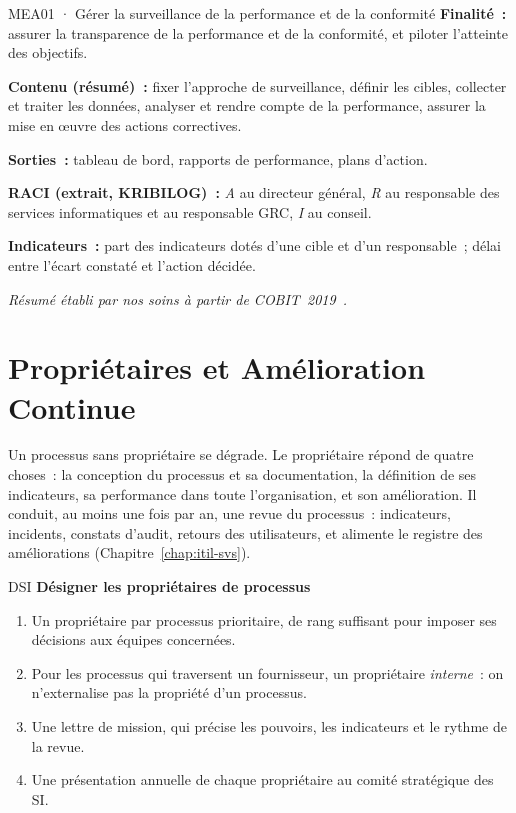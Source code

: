 \begin{boxobjet}{MEA01 · Gérer la surveillance de la performance et de la conformité}
\textbf{Finalité~:} assurer la transparence de la performance et de la
conformité, et piloter l'atteinte des objectifs.

\textbf{Contenu (résumé)~:} fixer l'approche de surveillance, définir les
cibles, collecter et traiter les données, analyser et rendre compte de la
performance, assurer la mise en œuvre des actions correctives.

\textbf{Sorties~:} tableau de bord, rapports de performance, plans d'action.

\textbf{RACI (extrait, KRIBILOG)~:} \emph{A} au directeur général,
\emph{R} au responsable des services informatiques et au responsable GRC,
\emph{I} au conseil.

\textbf{Indicateurs~:} part des indicateurs dotés d'une cible et d'un
responsable~; délai entre l'écart constaté et l'action décidée.
\end{boxobjet}
{\small\itshape Résumé établi par nos soins à partir de
COBIT~2019~\cite{isaca2018cobitobjectifs}.}

\section{Propriétaires et Amélioration Continue}
\label{sec:c16-proprietaires}

Un processus sans propriétaire se dégrade. Le propriétaire répond de
quatre choses~: la conception du processus et sa documentation, la
définition de ses indicateurs, sa performance dans toute l'organisation,
et son amélioration. Il conduit, au moins une fois par an, une revue du
processus~: indicateurs, incidents, constats d'audit, retours des
utilisateurs, et alimente le registre des améliorations
(Chapitre~\ref{chap:itil-svs}).

\begin{boxmetier}{DSI}
\textbf{Désigner les propriétaires de processus}
\begin{enumerate}
    \item Un propriétaire par processus prioritaire, de rang suffisant pour
          imposer ses décisions aux équipes concernées.
    \item Pour les processus qui traversent un fournisseur, un propriétaire
          \emph{interne}~: on n'externalise pas la propriété d'un processus.
    \item Une lettre de mission, qui précise les pouvoirs, les indicateurs et
          le rythme de la revue.
    \item Une présentation annuelle de chaque propriétaire au comité
          stratégique des SI.
\end{enumerate}
\end{boxmetier}


